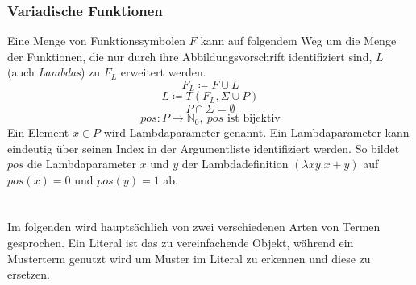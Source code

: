 \documentclass{article}
\begin{document}
\subsubsection{Variadische Funktionen}









Eine Menge von Funktionssymbolen $F$ kann auf folgendem Weg um die Menge der Funktionen, die nur durch ihre Abbildungsvorschrift identifiziert sind, $L$ (auch \textit{Lambdas}) zu $F_L$ erweitert werden.
$$F_L \coloneqq F \cup L$$
$$L \coloneqq T(F_L, \Sigma \cup P)$$
$$P \cap \Sigma = \emptyset$$
$$pos \colon P \rightarrow \mathbb{N}_0, ~pos\text{ ist bijektiv}$$
Ein Element $x \in P$ wird Lambdaparameter genannt. Ein Lambdaparameter kann eindeutig über seinen Index in der Argumentliste identifiziert werden. So bildet $pos$ die Lambdaparameter $x$ und $y$ der Lambdadefinition $(\lambda x y. x+y)$ auf $pos(x) = 0$ und $pos(y) = 1$ ab. \\~\\~\\





Im folgenden wird hauptsächlich von zwei verschiedenen Arten von Termen gesprochen. Ein Literal ist das zu vereinfachende Objekt, während ein Musterterm genutzt wird um Muster im Literal zu erkennen und diese zu ersetzen. \\
\end{document}
